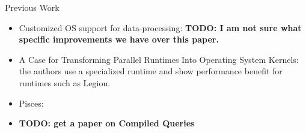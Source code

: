 \begin{block}{Previous Work}
  \begin{itemize}
  \item Customized OS support for data-processing: \alert{\textbf{TODO: I am not sure what specific improvements we have over this paper.}}
  \item A Case for Transforming Parallel Runtimes Into Operating System Kernels: the authors use a specialized runtime and show performance benefit for runtimes such as Legion.
  \item Pisces: 
  \item \alert{\textbf{TODO: get a paper on Compiled Queries}}
  \end{itemize}
\end{block}
